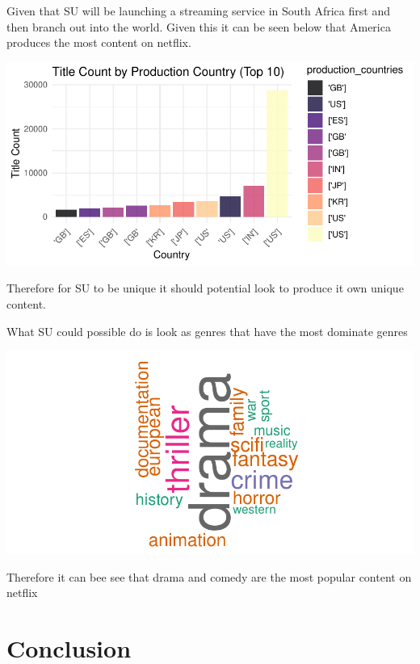\documentclass[12pt,preprint, authoryear]{elsarticle}
\let\origfigure\figure
\let\endorigfigure\endfigure
\renewenvironment{figure}[1][2] {
    \expandafter\origfigure\expandafter[H]
} {
    \endorigfigure
}
\numberwithin{equation}{section}
\numberwithin{figure}{section}
\numberwithin{table}{section}
\begin{document}
Given that SU will be launching a streaming service in South Africa
first and then branch out into the world. Given this it can be seen
below that America produces the most content on netflix.

\begin{figure}[H]

{\centering \includegraphics{Q4_files/figure-latex/Figure7-1} 

}

\caption{Content Produced by Country \label{Figure1}}\label{fig:Figure7}
\end{figure}

Therefore for SU to be unique it should potential look to produce it own
unique content.

What SU could possible do is look as genres that have the most dominate
genres

\begin{figure}[H]

{\centering \includegraphics{Q4_files/figure-latex/Figure8-1} 

}

\caption{Word cloud most dominate genres \label{Figure2}}\label{fig:Figure8}
\end{figure}

Therefore it can bee see that drama and comedy are the most popular
content on netflix

\hypertarget{conclusion}{%
\section{Conclusion}\label{conclusion}}


\end{document}
